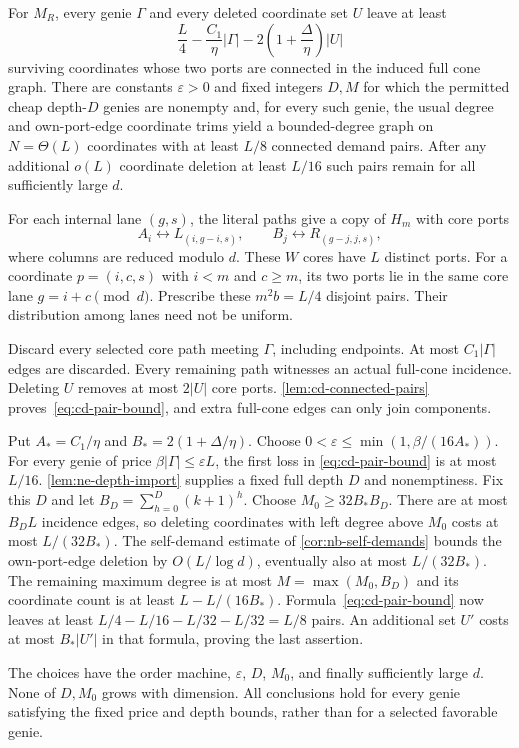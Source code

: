 \begin{theorem}
\notformalized
\label{thm:cd-robust-demands}
For $M_R$, every genie $\Gamma$ and every deleted coordinate set $U$
leave at least
\begin{equation}\label{eq:cd-pair-bound}
 \frac L4-\frac{C_1}{\eta}|\Gamma|
             -2\left(1+\frac\Delta\eta\right)|U|
\end{equation}
surviving coordinates whose two ports are connected in the induced full
cone graph.  There are constants $\varepsilon>0$ and fixed integers
$D,M$ for which the permitted cheap depth-$D$ genies are nonempty and,
for every such genie, the usual degree and own-port-edge coordinate
trims yield a bounded-degree graph on $N=\Theta(L)$ coordinates with at
least $L/8$ connected demand pairs.  After any additional $o(L)$
coordinate deletion at least $L/16$ such pairs remain for all sufficiently
large $d$.
\end{theorem}

\begin{informalproof}
For each internal lane $(g,s)$, the literal paths give a copy of $H_m$
with core ports
\[
 A_i\longleftrightarrow L_{(i,g-i,s)},\qquad
 B_j\longleftrightarrow R_{(g-j,j,s)},
\]
where columns are reduced modulo $d$.  These $W$ cores have $L$ distinct
ports.  For a coordinate $p=(i,c,s)$ with $i<m$ and $c\ge m$, its two
ports lie in the same core lane $g=i+c\pmod d$.  Prescribe these
$m^2b=L/4$ disjoint pairs.  Their distribution among lanes need not be
uniform.

Discard every selected core path meeting $\Gamma$, including endpoints.
At most $C_1|\Gamma|$ edges are discarded.  Every remaining path witnesses
an actual full-cone incidence.  Deleting $U$ removes at most $2|U|$ core
ports.  \cref{lem:cd-connected-pairs} proves~\eqref{eq:cd-pair-bound},
and extra full-cone edges can only join components.

Put $A_*=C_1/\eta$ and $B_*=2(1+\Delta/\eta)$.  Choose
$0<\varepsilon\le\min(1,\beta/(16A_*))$.  For every genie of price
$\beta|\Gamma|\le\varepsilon L$, the first loss in
\eqref{eq:cd-pair-bound} is at most $L/16$.  \cref{lem:ne-depth-import}
supplies a fixed full depth $D$ and nonemptiness.  Fix this $D$ and let
$B_D=\sum_{h=0}^D(k+1)^h$.  Choose $M_0\ge32B_*B_D$.
There are at most $B_D L$ incidence edges, so deleting coordinates with
left degree above $M_0$ costs at most $L/(32B_*)$.  The self-demand
estimate of \cref{cor:nb-self-demands} bounds the own-port-edge deletion by
$O(L/\log d)$, eventually also at most $L/(32B_*)$.  The remaining
maximum degree is at most $M=\max(M_0,B_D)$ and its coordinate count is
at least $L-L/(16B_*)$.  Formula~\eqref{eq:cd-pair-bound} now leaves
at least $L/4-L/16-L/32-L/32=L/8$ pairs.  An additional set $U'$ costs
at most $B_*|U'|$ in that formula, proving the last assertion.

The choices have the order machine, $\varepsilon$, $D$, $M_0$, and
finally sufficiently large $d$.  None of $D,M_0$ grows with dimension.
All conclusions hold for every genie satisfying the fixed price and
depth bounds, rather than for a selected favorable genie.
\end{informalproof}

